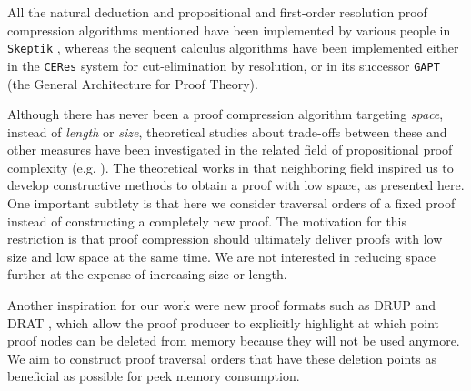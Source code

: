 All the natural deduction and propositional and first-order resolution proof compression algorithms mentioned have been implemented by various people in \texttt{Skeptik} \cite{SkeptikSystemDescription}, whereas the sequent calculus algorithms have been implemented either in the \texttt{CERes} system \cite{CERes} for cut-elimination by resolution, or in its successor \texttt{GAPT} \cite{GAPT} (the General Architecture for Proof Theory).

Although there has never been a proof compression algorithm targeting \emph{space}, instead of \emph{length} or \emph{size}, theoretical studies about trade-offs between these and other measures have been investigated in the related field of propositional proof complexity (e.g. \cite{Ben-Sasson2002}). The theoretical works in that neighboring field inspired us to develop constructive methods to obtain a proof with low space, as presented here. One important subtlety is that here we consider traversal orders of a fixed proof instead of constructing a completely new proof. The motivation for this restriction is that proof compression should ultimately deliver proofs with low size and low space at the same time. We are not interested in reducing space further at the expense of increasing size or length.

Another inspiration for our work were new proof formats such as DRUP \cite{DRUP} and DRAT \cite{raey}, which allow the proof producer to explicitly highlight at which point proof nodes can be deleted from memory because they will not be used anymore. We aim to construct proof traversal orders that have these deletion points as beneficial as possible for peek memory consumption.
